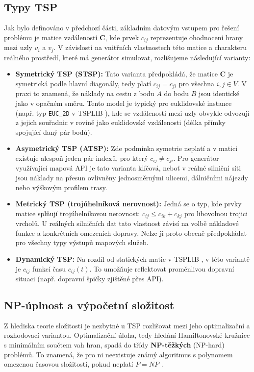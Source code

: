 \subsection{Typy TSP}
Jak bylo definováno v předchozí části, základním datovým vstupem pro řešení problému je matice vzdáleností $\mathbf{C}$, kde prvek $c_{ij}$ reprezentuje ohodnocení hrany mezi uzly $v_i$ a $v_j$. V závislosti na vnitřních vlastnostech této matice a charakteru reálného prostředí, které má generátor simulovat, rozlišujeme následující varianty:

\begin{itemize}
    \item \textbf{Symetrický TSP (STSP):} Tato varianta předpokládá, že matice $\mathbf{C}$ je symetrická podle hlavní diagonály, tedy platí $c_{ij} = c_{ji}$ pro všechna $i, j \in V$. V praxi to znamená, že náklady na cestu z bodu $A$ do bodu $B$ jsou identické jako v opačném směru. Tento model je typický pro euklidovské instance (např. typ \texttt{EUC\_2D} v TSPLIB \cite{reinelt1994tsplib,tsplib95}), kde se vzdálenosti mezi uzly obvykle odvozují z jejich souřadnic v rovině jako euklidovské vzdálenosti (délka přímky spojující daný pár bodů).
    
    \item \textbf{Asymetrický TSP (ATSP):} Zde podmínka symetrie neplatí a v matici existuje alespoň jeden pár indexů, pro který $c_{ij} \neq c_{ji}$. Pro generátor využívající mapová API je tato varianta klíčová, neboť v reálné silniční síti jsou náklady na přesun ovlivněny jednosměrnými ulicemi, dálničními nájezdy nebo výškovým profilem trasy.
    
    \item \textbf{Metrický TSP (trojúhelníková nerovnost):} Jedná se o typ, kde prvky matice splňují trojúhelníkovou nerovnost: $c_{ij} \leq c_{ik} + c_{kj}$ pro libovolnou trojici vrcholů. U reálných silničních dat tato vlastnost závisí na volbě nákladové funkce a konkrétních omezeních dopravy. Nelze ji proto obecně předpokládat pro všechny typy výstupů mapových služeb.
    
    \item \textbf{Dynamický TSP:} Na rozdíl od statických matic v TSPLIB \cite{reinelt1994tsplib,tsplib95}, v této variantě je $c_{ij}$ funkcí času $c_{ij}(t)$. To umožňuje reflektovat proměnlivou dopravní situaci (např. dopravní špičky zjištěné přes API).
\end{itemize}


\subsection{NP-úplnost a výpočetní složitost}
Z hlediska teorie složitosti je nezbytné u TSP rozlišovat mezi jeho optimalizační a rozhodovací variantou. Optimalizační úloha, tedy hledání Hamiltonovské kružnice s minimálním součtem vah hran, spadá do třídy \textbf{NP-těžkých} (NP-hard) problémů. To znamená, že pro ni neexistuje známý algoritmus s polynomem omezenou časovou složitostí, pokud neplatí $P = NP$ \cite{reinelt1994tsplib}.

